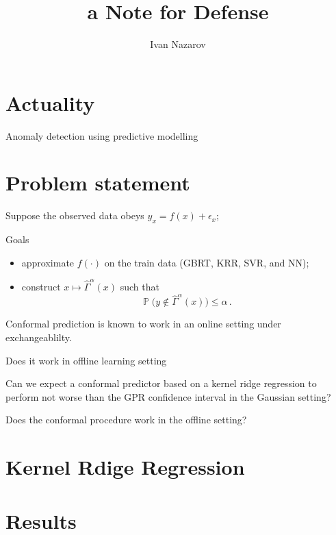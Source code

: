 \documentclass[a4paper,14pt]{extarticle}
\title{a Note for Defense}
\author{Ivan Nazarov}
\newcommand{\pr}{\mathop{\mathbb{P}}\nolimits}
\begin{document}
\maketitle

\section{Actuality} %
\label{sec:actuality}

Anomaly detection using predictive modelling


\section{Problem statement} %
\label{sec:problem_statement}

Suppose the observed data obeys $y_x = f(x) + \epsilon_x$;

Goals \begin{itemize}
  \item approximate $f(\cdot)$ on the train data (GBRT, KRR, SVR, and NN);
  \item construct $x \mapsto \hat{\Gamma}^\alpha(x)$ such that
    $$ \pr\bigl(y \notin \hat{\Gamma}^\alpha(x)\bigr) \leq \alpha \,. $$
\end{itemize}

Conformal prediction is known to work in an online setting under exchangeablilty.

Does it work in offline learning setting

Can we expect a conformal predictor based on a kernel ridge regression to perform
not worse than the GPR confidence interval in the Gaussian setting?

Does the conformal procedure work in the offline setting?



\section{Kernel Rdige Regression} %
\label{sec:kernel_rdige_regression}


\section{Results} %
\label{sec:results}
\end{document}

